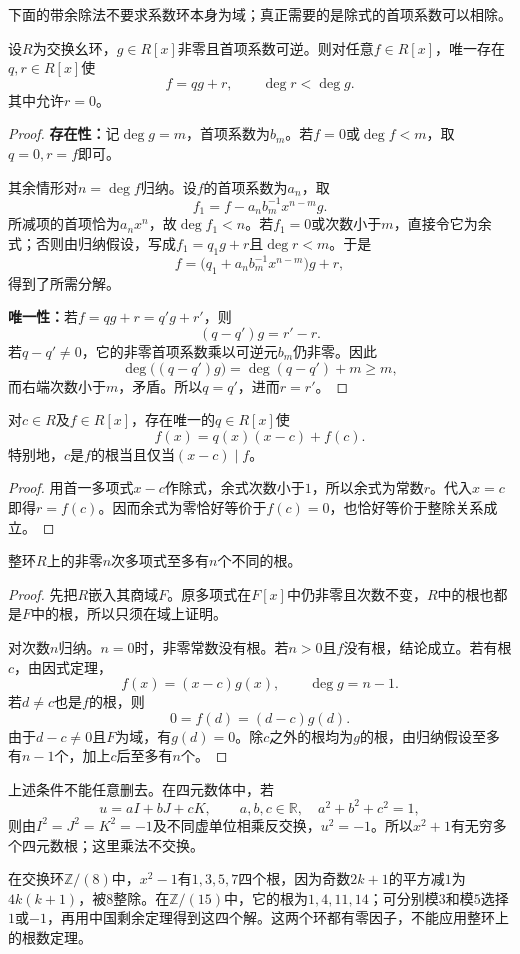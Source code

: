 下面的带余除法不要求系数环本身为域；真正需要的是除式的首项系数可以相除。

\begin{theorem}\label{p2:poly-division}
设$R$为交换幺环，$g\in R[x]$非零且首项系数可逆。则对任意$f\in R[x]$，唯一存在$q,r\in R[x]$使
\[
f=qg+r,\qquad \deg r<\deg g.
\]
其中允许$r=0$。
\end{theorem}
\begin{proof}
\textbf{存在性：}记$\deg g=m$，首项系数为$b_m$。若$f=0$或$\deg f<m$，取$q=0,r=f$即可。

其余情形对$n=\deg f$归纳。设$f$的首项系数为$a_n$，取
\[
f_1=f-a_nb_m^{-1}x^{n-m}g.
\]
所减项的首项恰为$a_nx^n$，故$\deg f_1<n$。若$f_1=0$或次数小于$m$，直接令它为余式；否则由归纳假设，写成$f_1=q_1g+r$且$\deg r<m$。于是
\[
f=\bigl(q_1+a_nb_m^{-1}x^{n-m}\bigr)g+r,
\]
得到了所需分解。

\textbf{唯一性：}若$f=qg+r=q'g+r'$，则
\[
(q-q')g=r'-r.
\]
若$q-q'\ne0$，它的非零首项系数乘以可逆元$b_m$仍非零。因此
\[
\deg\bigl((q-q')g\bigr)=\deg(q-q')+m\ge m,
\]
而右端次数小于$m$，矛盾。所以$q=q'$，进而$r=r'$。
\end{proof}

\begin{corollary}
对$c\in R$及$f\in R[x]$，存在唯一的$q\in R[x]$使
\[
f(x)=q(x)(x-c)+f(c).
\]
特别地，$c$是$f$的根当且仅当$(x-c)\mid f$。
\end{corollary}
\begin{proof}
用首一多项式$x-c$作除式，余式次数小于$1$，所以余式为常数$r$。代入$x=c$即得$r=f(c)$。因而余式为零恰好等价于$f(c)=0$，也恰好等价于整除关系成立。
\end{proof}

\begin{theorem}\label{p2:poly-roots}
整环$R$上的非零$n$次多项式至多有$n$个不同的根。
\end{theorem}
\begin{proof}
先把$R$嵌入其商域$F$。原多项式在$F[x]$中仍非零且次数不变，$R$中的根也都是$F$中的根，所以只须在域上证明。

对次数$n$归纳。$n=0$时，非零常数没有根。若$n>0$且$f$没有根，结论成立。若有根$c$，由因式定理，
\[
f(x)=(x-c)g(x),\qquad\deg g=n-1.
\]
若$d\ne c$也是$f$的根，则
\[
0=f(d)=(d-c)g(d).
\]
由于$d-c\ne0$且$F$为域，有$g(d)=0$。除$c$之外的根均为$g$的根，由归纳假设至多有$n-1$个，加上$c$后至多有$n$个。
\end{proof}

\begin{example}
上述条件不能任意删去。在四元数体中，若
\[
u=aI+bJ+cK,\qquad a,b,c\in\mathbb R,\quad a^2+b^2+c^2=1,
\]
则由$I^2=J^2=K^2=-1$及不同虚单位相乘反交换，$u^2=-1$。所以$x^2+1$有无穷多个四元数根；这里乘法不交换。

在交换环$\mathbb Z/(8)$中，$x^2-1$有$1,3,5,7$四个根，因为奇数$2k+1$的平方减$1$为$4k(k+1)$，被$8$整除。在$\mathbb Z/(15)$中，它的根为$1,4,11,14$；可分别模$3$和模$5$选择$1$或$-1$，再用中国剩余定理得到这四个解。这两个环都有零因子，不能应用整环上的根数定理。
\end{example}

